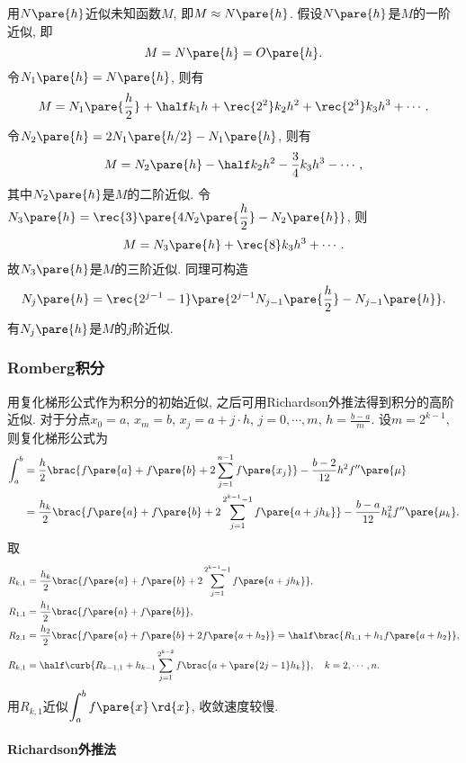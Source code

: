 \documentclass[hidelinks]{ctexart}
\begin{document}
用$N\pare{h}$近似未知函数$M$, 即$M\approx N\pare{h}$. 假设$N\pare{h}$是$M$的一阶近似, 即
\[ M = N\pare{h} = O\pare{h}. \]
令$N_1\pare{h} = N\pare{h}$, 则有
\[ M = N_1\pare{\frac{h}{2}} + \half k_1 h + \rec{2^2}k_2 h^2 + \rec{2^3}k_3 h^3 + \cdots. \]
令$N_2\pare{h} = 2N_1\pare{h/2} - N_1\pare{h}$, 则有
\[ M = N_2\pare{h} - \half k_2 h^2 - \frac{3}{4}k_3h^3 - \cdots, \]
其中$N_2\pare{h}$是$M$的二阶近似. 令$N_3\pare{h} = \displaystyle \rec{3} \pare{4N_2\pare{\frac{h}{2}} - N_2\pare{h}}$, 则
\[ M = N_3\pare{h} + \rec{8}k_3 h^3 + \cdots. \]
故$N_3\pare{h}$是$M$的三阶近似. 同理可构造
\[ N_j\pare{h} = \rec{2^{j-1}-1}\pare{2^{j-1}N_{j-1}\pare{\frac{h}{2}} - N_{j-1}\pare{h}}. \]
有$N_j\pare{h}$是$M$的$j$阶近似.


\subsubsection{Romberg积分} %
\label{ssub:romberg积分}

用复化梯形公式作为积分的初始近似, 之后可用Richardson外推法得到积分的高阶近似. 对于分点$x_0 = a$, $x_m = b$, $\displaystyle x_j = a+j\cdot h$, $j = 0,\cdots,m$, $\displaystyle h = \frac{b-a}{m}$. 设$m=2^{k-1}$, 则复化梯形公式为
\begin{align*}
    \int_a^b &= \frac{h}{2}\brac{f\pare{a} + f\pare{b} + 2\sum_{j=1}^{n-1} f\pare{x_j}} - \frac{b-2}{12}h^2 f''\pare{\mu} \\
    &= \frac{h_k}{2}\brac{f\pare{a} + f\pare{b} + 2\sum_{j=1}^{2^{k-1}-1}f\pare{a+jh_k}} - \frac{b-a}{12}h_k^2 f''\pare{\mu_k}.
\end{align*}
取
\begin{align*}
    R_{k,1} &= \frac{h_k}{2}\brac{f\pare{a} + f\pare{b} + 2\sum_{j=1}^{2^{k-1}-1} f\pare{a+jh_k}}, \\
    R_{1,1} &= \frac{h_1}{2}\brac{f\pare{a} + f\pare{b}}, \\
    R_{2,1} &= \frac{h_2}{2}\brac{f\pare{a} + f\pare{b} + 2f\pare{a+h_2}} = \half \brac{R_{1,1} + h_1 f\pare{a+h_2}}, \\
    R_{k,1} &= \half \curb{R_{k-1,1} + h_{k-1} \sum_{j=1}^{2^{k-2}} f\brac{a+\pare{2j-1}h_k}},\quad k = 2,\cdots,n.
\end{align*}
用$R_{k,1}$近似$\displaystyle \int_a^b f\pare{x}\,\rd{x}$, 收敛速度较慢.

\paragraph{Richardson外推法} %
\label{par:richardson外推法}
\end{document}
